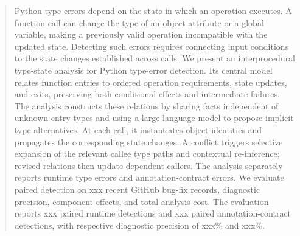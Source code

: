 \begin{abstract}
Python type errors depend on the state in which an operation executes.
A function call can change the type of an object attribute or a global
variable, making a previously valid operation incompatible with the updated
state. Detecting such errors requires connecting input conditions to the
state changes established across calls. We present an interprocedural
type-state analysis for Python type-error detection. Its central model
relates function entries to ordered operation requirements, state updates,
and exits, preserving both conditional effects and intermediate failures.
The analysis constructs these relations by sharing facts independent of
unknown entry types and using a large language model to propose implicit
type alternatives. At each call, it instantiates object identities and
propagates the corresponding state changes. A conflict triggers selective
expansion of the relevant callee type paths and contextual re-inference;
revised relations then update dependent callers. The analysis separately
reports runtime type errors and annotation-contract errors. We evaluate
paired detection on xxx recent GitHub bug-fix records, diagnostic precision,
component effects, and total analysis cost. The evaluation reports
xxx paired runtime detections and xxx paired annotation-contract detections,
with respective diagnostic precision of xxx\% and xxx\%.
\end{abstract}
